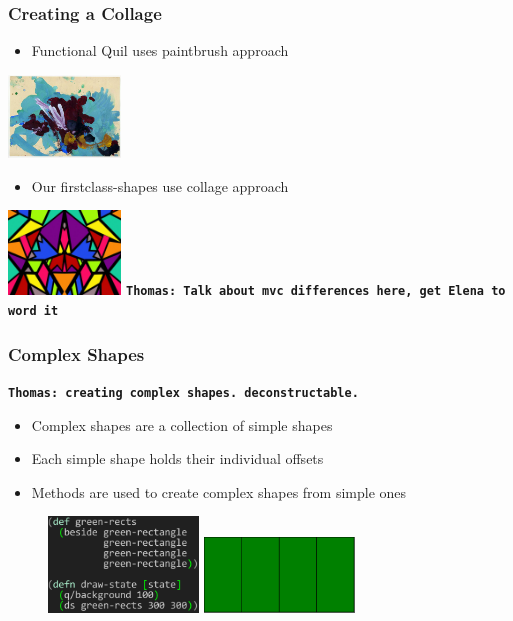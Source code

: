 \documentclass{beamer}
\newcommand{\comment}[1]{{\bf \tt  {#1}}}
\newcommand{\thcomment}[1]{\textcolor{BestBlue}{\comment{Thomas: {#1}}}}
\begin{document}
\begin{frame}
\frametitle{Creating a Collage}
	\begin{itemize}
		\item Functional Quil uses paintbrush approach
	\end{itemize}
	\includegraphics[width=3cm]{PresentationImages/painting.jpg}
	\begin{itemize}
		\item Our firstclass-shapes use collage approach
	\end{itemize}
	\includegraphics[width=3cm]{PresentationImages/collage.jpg}
\thcomment{Talk about mvc differences here, get Elena to word it}
\end{frame}

\begin{frame}
\frametitle{Complex Shapes}
\thcomment{creating complex shapes. deconstructable.}
	\begin{itemize}
		\item Complex shapes are a collection of simple shapes
		\item Each simple shape holds their individual offsets
		\item Methods are used to create complex shapes from simple ones
	\end{itemize}
	\begin{figure}
	\includegraphics[width=4cm]{PresentationImages/fcsGreenRects.png}
	\hspace{1cm}
	\includegraphics[width=4cm]{PresentationImages/4GreenRects.png}
	\end{figure}
\end{frame}
\end{document}
